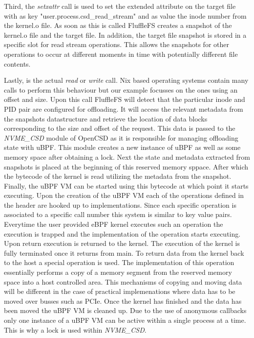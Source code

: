 Third, the \textit{setxattr} call is used to set the extended attribute on the
target file with as key "user.process.csd\_read\_stream" and as value the inode
number from the kernel.o file. As soon as this is called FluffleFS creates a
snapshot of the kernel.o file and the target file. In addition, the target file
snapshot is stored in a specific slot for read stream operations. This allows
the snapshots for other operations to occur at different moments in time with
potentially different file contents.

Lastly, is the actual \textit{read} or \textit{write} call. Nix based operating
systems contain many calls to perform this behaviour but our example focusses
on the ones using an offset and size. Upon this call FluffleFS will detect that
the particular inode and PID pair are configured for offloading. It will access
the relevant metadata from the snapshots datastructure and retrieve the
location of data blocks corresponding to the size and offset of the request.
This data is passed to the \textit{NVME\_CSD} module of OpenCSD as it is
responsible for managing offloading state with uBPF. This module creates a new
instance of uBPF as well as some memory space after obtaining a lock. Next the
state and metadata extracted from snapshots is placed at the beginning of this
reserved memory sppace. After which the bytecode of the kernel is read utilizing
the metadata from the snapshot. Finally, the uBPF VM can be started using this
bytecode at which point it starts executing. Upon the creation of the uBPF VM
each of the operations defined in the header are hooked up to implementations.
Since each specific operation is associated to a specific call number this
system is similar to key value pairs. Everytime the user provided eBPF kernel
executes such an operation the execution is trapped and the implementation of
the operation starts executing. Upon return execution is returned to the kernel.
The execution of the kernel is fully terminated once it returns from main. To
return data from the kernel back to the host a special operation is used. The
implementation of this operation essentially performs a copy of a memory segment
from the reserved memory space into a host controlled area. This mechanisms of
copying and moving data will be different in the case of practical
implemenations where data has to be moved over busses such as PCIe. Once the
kernel has finished and the data has been moved the uBPF VM is cleaned up. Due
to the use of anonymous callbacks only one instance of a uBPF VM can be active
within a single process at a time. This is why a lock is used within
\textit{NVME\_CSD}.

